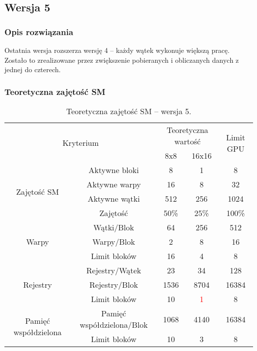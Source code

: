 
\subsection{Wersja 5}

\subsubsection{Opis rozwiązania}

Ostatnia wersja rozszerza wersję 4 -- każdy wątek wykonuje większą pracę. Zostało to zrealizowane przez zwiększenie pobieranych i obliczanych danych z jednej do czterech.



\subsubsection{Teoretyczna zajętość SM}

\begin{center}
\begin{table}[H]
\centering
\begin{tabular}{|c|c|c|c|c|}
\hline
\multicolumn{2}{|c|}{\multirow{2}{*}{Kryterium}} & \multicolumn{2}{c|}{Teoretyczna wartość} & \multirow{2}{*}{Limit GPU} \\ \cline{3-4}
\multicolumn{2}{|c|}{} & 8x8 & 16x16 & \\ \hline
\multirow{4}{*}{Zajętość SM} & Aktywne bloki & 8 & 1 & 8 \\ \cline{2-5}
& Aktywne warpy & 16 & 8 & 32 \\ \cline{2-5}
& Aktywne wątki & 512 & 256 & 1024 \\ \cline{2-5}
& Zajętość & 50\% & 25\% & 100\% \\ \hline
\multirow{3}{*}{Warpy} & Wątki/Blok & 64 & 256 & 512 \\ \cline{2-5}
& Warpy/Blok & 2 & 8 & 16 \\ \cline{2-5}
& Limit bloków & 16 & 4 & 8 \\ \hline
\multirow{3}{*}{Rejestry} & Rejestry/Wątek & 23 & 34 & 128 \\ \cline{2-5}
& Rejestry/Blok & 1536 & 8704 & 16384 \\ \cline{2-5}
& Limit bloków & 10 & \textcolor{red}{1} & 8 \\ \hline
\multirow{2}{*}{Pamięć współdzielona} & Pamięć współdzielona/Blok & 1068 & 4140 & 16384 \\ \cline{2-5}
& Limit bloków & 10 & 3 & 8 \\ \hline
\end{tabular}
\caption{Teoretyczna zajętość SM -- wersja 5.}
\end{table}
\end{center}

